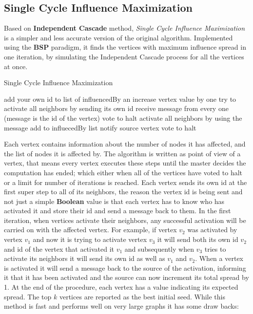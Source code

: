 \documentclass[english]{tktltiki}
\begin{document}
\subsection{Single Cycle Influence Maximization}
Based on \cite{kempe03} \textbf{Independent Cascade} method, \textit{Single Cycle Influence Maximization} is a simpler and less accurate version of the original algorithm. Implemented using the \textbf{BSP} paradigm, it finds the vertices with maximum influence spread in one iteration, by simulating the Independent Cascade process for all the vertices at once.
\begin{algorithm}[ht!]
\caption{Single Cycle Influence Maximization}
\label{alg:singleccycleIM}
\begin{algorithmic}
	\State add your own id to list of influencedBy an increase vertex value by one
	\State try to activate all neighbors by sending its own id
\Else
	\State receive message from every one (message is the id of the vertex)
			\State vote to halt
		\Else
			\State activate all neighbors by using the message
			\State add to influecedBy list
			\State notify source vertex
			\State vote to halt
		\EndIf	
	\EndFor
\EndIf
\end{algorithmic}
\end{algorithm}
Each vertex contains information about the number of nodes it has affected, and the list of nodes it is affected by. The algorithm is written as point of view of a vertex, that means every vertex executes these steps until the master decides the computation has ended; which either when all of the vertices have voted to halt or a limit for number of iterations is reached. Each vertex sends its own id at the first super step to all of its neighbors, the reason the vertex id is being sent and not just a simple \textbf{Boolean} value is that each vertex has to know who has activated it and store their id and send a message back to them. In the first iteration, when vertices activate their neighbors, any successful activation will be carried on with the affected vertex. For example, if vertex $v_2$ was activated by vertex $v_1$ and now it is trying to activate vertex $v_3$ it will send both its own id $v_2$ and id of the vertex that activated it $v_1$ and subsequently when $v_3$ tries to activate its neighbors it will send its own id as well as $v_1$ and $v_2$. When a vertex is activated it will send a message back to the source of the activation, informing it that it has been activated and the source can now increment its total spread by 1. At the end of the procedure, each vertex has a value indicating its expected spread. The top $k$ vertices are reported as the best initial seed. While this method is fast and performs well on very large graphs it has some draw backs:
\end{document}
